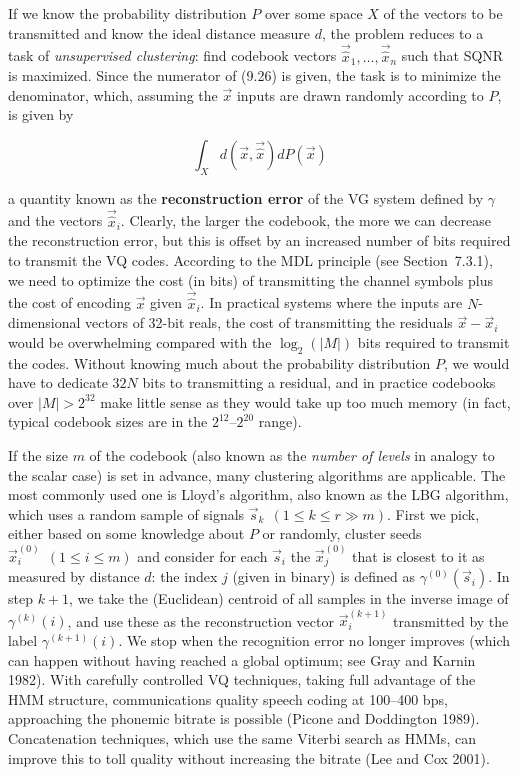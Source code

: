If we know the probability distribution $P$ over some space $X$ of the vectors
to be transmitted and know the ideal distance measure $d$, the problem reduces
to a task of {\it unsupervised clustering}:
find codebook vectors $\vec{\hat{x}}_1,\ldots,\vec{\hat{x}}_n$ such that SQNR
is maximized. Since the numerator of (9.26) is given, the task is to minimize
the denominator, which, assuming the $\vec{x}$ inputs are drawn randomly
according to $P$, is given by

\begin{equation}
\int_X d(\vec{x},\vec{\hat{x}})dP(\vec{x})
\end{equation}

\noindent
a quantity known as the {\bf reconstruction error}
of the VG system defined by $\gamma$ and the vectors $\vec{\hat{x}}_i$.
Clearly, the larger the codebook, the more we can decrease the reconstruction
error, but this is offset by an increased number of bits required to transmit
the VQ codes. According to the MDL principle (see Section~7.3.1), we need to
optimize the cost (in bits) of transmitting the channel symbols plus the cost
of encoding $\vec{x}$ given $\vec{\hat{x}}_i$. In practical systems where the
inputs are $N$-dimensional vectors of 32-bit reals, the cost of transmitting
the residuals $\vec{x}-\vec{x}_i$ would be overwhelming compared with the
$\log_2(|M|)$ bits required to transmit the codes. Without knowing much about
the probability distribution $P$, we would have to dedicate $32 N$ bits to
transmitting a residual, and in practice codebooks over $|M|>2^{32}$ make
little sense as they would take up too much memory (in fact, typical codebook
sizes are in the $2^{12}$--$2^{20}$ range).

If the size $m$ of the codebook (also known as the {\it number of levels} in
analogy to the scalar case) is set in advance, many clustering algorithms are
applicable. The most commonly used one is Lloyd's algorithm, also known as the
LBG algorithm, which uses a random
sample of signals $\vec{s}_k \ \ (1 \leq k \leq r \gg m)$. First we pick,
either based on some knowledge about $P$ or randomly, cluster seeds
$\vec{x}_i^{(0)} \ \ (1 \leq i \leq m)$ and consider for each $\vec{s}_i$
the $\vec{x}_j^{(0)}$ that is closest to it as measured by distance $d$: the
index $j$ (given in binary) is defined as $\gamma^{(0)}(\vec{s}_i)$. In step
$k+1$, we take the (Euclidean) centroid of all samples in the inverse image of
$\gamma^{(k)}(i)$, and use these as the reconstruction vector
$\vec{x}_i^{(k+1)}$ transmitted by the label $\gamma^{(k+1)}(i)$. We stop when
the recognition error no longer improves (which can happen without having
reached a global optimum; see Gray and Karnin 1982).\nocite{Gray:1982} With
carefully controlled VQ techniques, taking full advantage of the HMM
structure, communications quality speech coding at 100--400 bps, approaching
the phonemic bitrate is possible (Picone and
Doddington 1989).\nocite{Picone:1989} Concatenation techniques, which use 
the same Viterbi search as HMMs, can improve this to toll quality without 
increasing the bitrate (Lee and Cox 2001).\nocite{Lee:2001}


